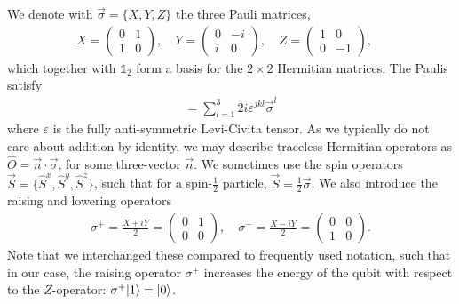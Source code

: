 We denote with $\vec{\sigma} = \{ X, Y, Z \}$ the three Pauli matrices,
\begin{align}
X = \begin{pmatrix}
0 & 1 \\ 1 & 0
\end{pmatrix}, \quad
Y = \begin{pmatrix}
0 & -i \\ i & 0
\end{pmatrix}, \quad
Z= \begin{pmatrix}
1 & 0 \\ 0 & -1
\end{pmatrix}, \quad
\label{eqn:paulimatrices}
\end{align}
which together with $\mathds{1}_2$ form a basis for the $2 \times 2$ Hermitian matrices. The Paulis satisfy
%
\begin{align}
[ \vec{\sigma}^j , \vec{\sigma}^k ] = \sum_{l=1}^3 2 i \varepsilon^{jkl} \vec{\sigma}^l
\end{align}
%
where $\varepsilon$ is the fully anti-symmetric Levi-Civita tensor. 
As we typically do not care about addition by identity, we may describe traceless Hermitian operators as $\hat{O} = \vec{n} \cdot \vec{\sigma}$, for some three-vector $\vec{n}$. We sometimes use the spin operators $\vec{S} = \{ \hat{S}^x, \hat{S}^y, \hat{S}^z \}$, such that for a spin-$\frac{1}{2}$ particle, $\vec{S} = \frac{1}{2} \vec{\sigma}$. We also introduce the raising and lowering operators 
 \begin{align}
\sigma^+ = \frac{X + i Y}{2} = 
\begin{pmatrix} 0 & 1 \\ 0 & 0 \end{pmatrix}, \quad
\sigma^- = \frac{X - i Y }{2} =
\begin{pmatrix} 0 & 0 \\ 1 & 0 \end{pmatrix}.
\label{eqn:raiselowerops}
 \end{align}
Note that we interchanged these compared to frequently used notation, such that in our case, the raising operator $\sigma^+$ increases the energy of the qubit with respect to the $Z$-operator: $\sigma^+ \lvert1\rangle = \lvert0\rangle$. 

